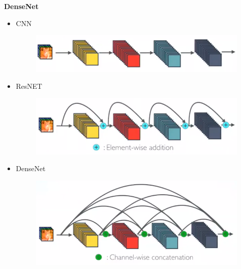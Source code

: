 \documentclass[xcolor=dvipsnames]{beamer}
\begin{document}
\begin{frame}{\bf DenseNet}

\begin{itemize}

    \item CNN
    \begin{figure}
      \includegraphics[scale=0.15]{../../diagrams/dnn_conv.png}
    \end{figure}

    \item ResNET
    \begin{figure}
      \includegraphics[scale=0.15]{../../diagrams/dnn_resnet.png}
    \end{figure}

    \item DenseNet
    \begin{figure}
      \includegraphics[scale=0.15]{../../diagrams/dnn_densenet.png}
    \end{figure}

\end{itemize}



\end{frame}
\end{document}
